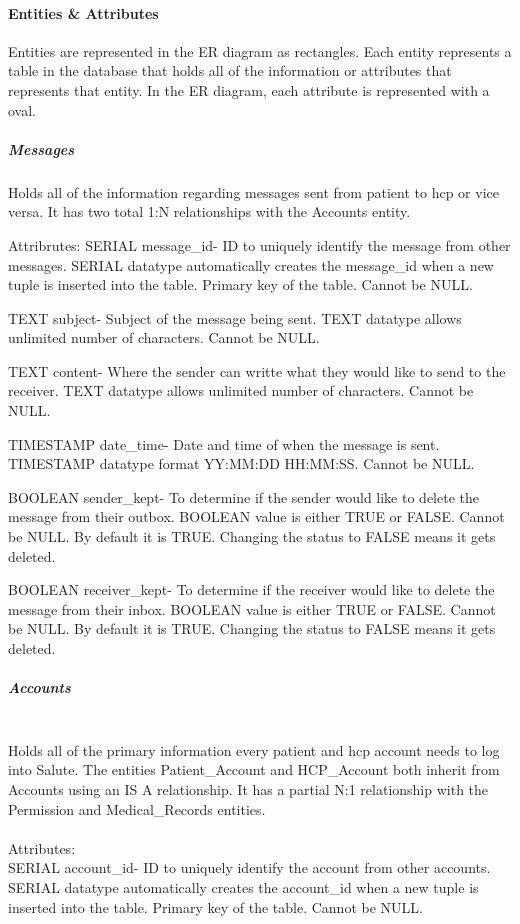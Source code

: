 \documentclass[12pt]{report}
\begin{document}
\paragraph{Entities & Attributes}
Entities are represented in the ER diagram as rectangles.  Each entity represents a table in the database that holds all of the information or attributes that represents that entity.  In the ER diagram, each attribute is represented with a oval.
\subparagraph{Messages}
Holds all of the information regarding messages sent from patient to hcp or vice versa. It has two total 1:N relationships with the Accounts entity.

Attribrutes:
SERIAL message_id- ID to uniquely identify the message from other messages. SERIAL datatype automatically creates the message_id when a new tuple is inserted into the table.  Primary key of the table.  Cannot be NULL.

TEXT subject- Subject of the message being sent. TEXT datatype allows unlimited number of characters.  Cannot be NULL.

TEXT content- Where the sender can writte what they would like to send to the receiver.  TEXT datatype allows unlimited number of characters.  Cannot be NULL.

TIMESTAMP date_time- Date and time of when the message is sent.  TIMESTAMP datatype format YY:MM:DD HH:MM:SS.  Cannot be NULL.

BOOLEAN sender_kept- To determine if the sender would like to delete the message from their outbox.  BOOLEAN value is either TRUE or FALSE.  Cannot be NULL.  By default it is TRUE.  Changing the status to FALSE means it gets deleted.

BOOLEAN receiver_kept- To determine if the receiver would like to delete the message from their inbox.  BOOLEAN value is either TRUE or FALSE.  Cannot be NULL.  By default it is TRUE.  Changing the status to FALSE means it gets deleted.

\subparagraph{Accounts}\\
Holds all of the primary information every patient and hcp account needs to log into Salute.  The entities Patient_Account and HCP_Account both inherit from Accounts using an IS A relationship.  It has a partial N:1 relationship with the Permission and Medical_Records entities.\\ \\

Attributes:\\
SERIAL account_id- ID to uniquely identify the account from other accounts. SERIAL datatype automatically creates the account_id when a new tuple is inserted into the table.  Primary key of the table.  Cannot be NULL.\\
\end{document}
